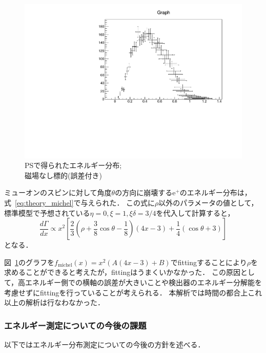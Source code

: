 \begin{figure}[H]
\begin{minipage}{0.4\columnwidth}
    \includegraphics[height=\columnwidth,angle=-90]{figure/ikemitsu/michel_PS_gosa.pdf}
    \caption{PSで得られたエネルギー分布;\\磁場なし標的(誤差付き)}
    \label{michel_PS_gosa} 
   \end{minipage}
  \end{figure}
  
  ミューオンのスピンに対して角度$\theta$の方向に崩壊する$\mathrm{e}^{+}$のエネルギー分布は，式~\ref{eq:theory_michel}で与えられた．
  この式に$\rho$以外のパラメータの値として，標準模型で予想されている$\eta = 0 , \xi = 1 , \xi \delta = 3/4$を代入して計算すると，
  \begin{equation*}
   \frac{d\Gamma}{dx} \propto x^{2} [\frac{2}{3}(\rho + \frac{3}{8}\cos \theta - \frac{1}{8})(4x-3) + \frac{1}{4}(\cos \theta + 3)]
  \end{equation*}
  となる．

  図~\ref{michel_PS_gosa}のグラフを$f_{\mathrm{michel}}(x) = x^{2} (A(4x -3) + B)$でfittingすることにより$\rho$を求めることができると考えたが，fittingはうまくいかなかった．
  この原因として，高エネルギー側での横軸の誤差が大きいことや検出器のエネルギー分解能を考慮せずにfittingを行っていることが考えられる．
  本解析では時間の都合上これ以上の解析は行なわなかった．

  \subsubsection{エネルギー測定についての今後の課題}
  以下ではエネルギー分布測定についての今後の方針を述べる．

